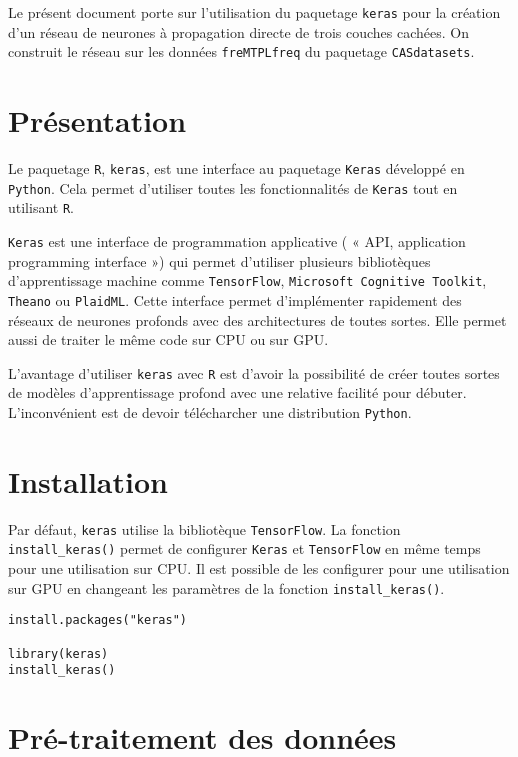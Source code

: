 \documentclass[11pt,letterpaper]{article}
\begin{document}
Le présent document porte sur l'utilisation du paquetage \verb`keras` pour la création d'un réseau de neurones à propagation directe de trois couches cachées. On construit le réseau sur les données \verb`freMTPLfreq` du paquetage \verb`CASdatasets`. 

\section{Présentation}

Le paquetage \verb`R`, \verb`keras`, est une interface au paquetage \verb`Keras` développé en \verb`Python`. Cela permet d'utiliser toutes les fonctionnalités de \verb`Keras` tout en utilisant \verb`R`. 

\verb`Keras` est une interface de programmation applicative ( « API, application programming interface ») qui permet d'utiliser plusieurs bibliotèques d'apprentissage machine comme \verb`TensorFlow`, \verb`Microsoft Cognitive Toolkit`, \verb`Theano` ou \verb`PlaidML`. Cette interface permet d'implémenter rapidement des réseaux de neurones profonds avec des architectures de toutes sortes. Elle permet aussi de traiter le même code sur CPU ou sur GPU.

L'avantage d'utiliser \verb`keras` avec \verb`R` est d'avoir la possibilité de créer toutes sortes de modèles d'apprentissage profond avec une relative facilité pour débuter. L'inconvénient est de devoir télécharcher une distribution \verb`Python`. 



\section{Installation}

Par défaut, \verb`keras` utilise la bibliotèque \verb`TensorFlow`. La fonction \verb`install_keras()` permet de configurer \verb`Keras` et \verb`TensorFlow` en même temps pour une utilisation sur CPU. Il est possible de les configurer pour une utilisation sur GPU en changeant les paramètres de la fonction \verb`install_keras()`. 


\begin{lstlisting}
install.packages("keras")

library(keras)
install_keras()
\end{lstlisting}



\section{Pré-traitement des données}
\end{document}
